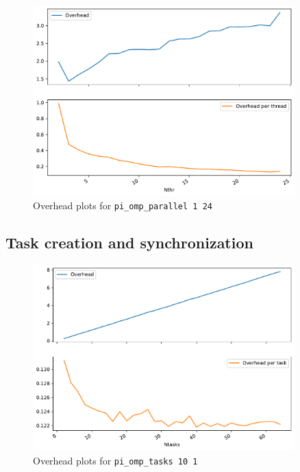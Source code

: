 \begin{figure}[H]
    \centering
    \caption{Overhead plots for \texttt{pi\_omp\_parallel 1 24}}%
    \label{fig:parallel}
    \includegraphics[width=0.9\textwidth]{data/parallel_sub.pdf}
\end{figure}

\subsection{Task creation and synchronization}

\begin{figure}[H]
    \centering
    \caption{Overhead plots for \texttt{pi\_omp\_tasks 10 1}}%
    \label{fig:task}
    \includegraphics[width=0.9\textwidth]{data/tasks_sub.pdf}
\end{figure}


